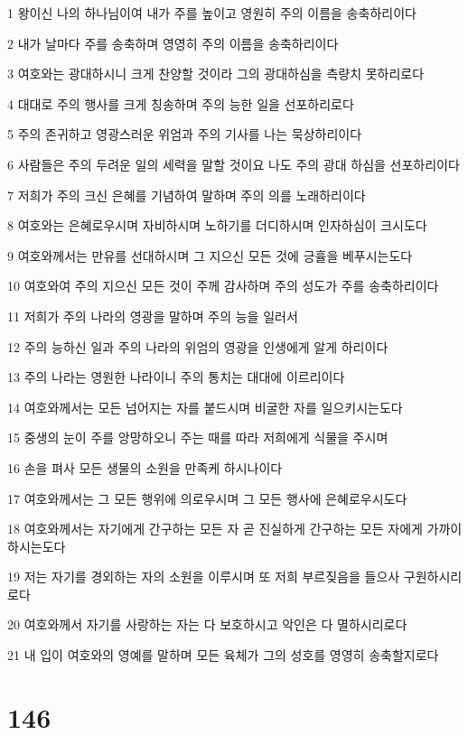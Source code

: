 \par 1 왕이신 나의 하나님이여 내가 주를 높이고 영원히 주의 이름을 송축하리이다
\par 2 내가 날마다 주를 송축하며 영영히 주의 이름을 송축하리이다
\par 3 여호와는 광대하시니 크게 찬양할 것이라 그의 광대하심을 측량치 못하리로다
\par 4 대대로 주의 행사를 크게 칭송하며 주의 능한 일을 선포하리로다
\par 5 주의 존귀하고 영광스러운 위엄과 주의 기사를 나는 묵상하리이다
\par 6 사람들은 주의 두려운 일의 세력을 말할 것이요 나도 주의 광대 하심을 선포하리이다
\par 7 저희가 주의 크신 은혜를 기념하여 말하며 주의 의를 노래하리이다
\par 8 여호와는 은혜로우시며 자비하시며 노하기를 더디하시며 인자하심이 크시도다
\par 9 여호와께서는 만유를 선대하시며 그 지으신 모든 것에 긍휼을 베푸시는도다
\par 10 여호와여 주의 지으신 모든 것이 주께 감사하며 주의 성도가 주를 송축하리이다
\par 11 저희가 주의 나라의 영광을 말하며 주의 능을 일러서
\par 12 주의 능하신 일과 주의 나라의 위엄의 영광을 인생에게 알게 하리이다
\par 13 주의 나라는 영원한 나라이니 주의 통치는 대대에 이르리이다
\par 14 여호와께서는 모든 넘어지는 자를 붙드시며 비굴한 자를 일으키시는도다
\par 15 중생의 눈이 주를 앙망하오니 주는 때를 따라 저희에게 식물을 주시며
\par 16 손을 펴사 모든 생물의 소원을 만족케 하시나이다
\par 17 여호와께서는 그 모든 행위에 의로우시며 그 모든 행사에 은혜로우시도다
\par 18 여호와께서는 자기에게 간구하는 모든 자 곧 진실하게 간구하는 모든 자에게 가까이 하시는도다
\par 19 저는 자기를 경외하는 자의 소원을 이루시며 또 저희 부르짖음을 들으사 구원하시리로다
\par 20 여호와께서 자기를 사랑하는 자는 다 보호하시고 악인은 다 멸하시리로다
\par 21 내 입이 여호와의 영예를 말하며 모든 육체가 그의 성호를 영영히 송축할지로다

\chapter{146}

